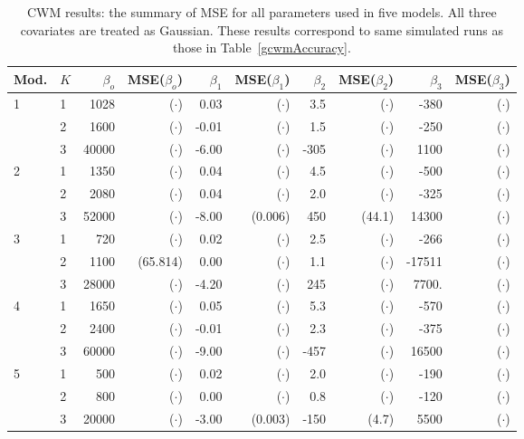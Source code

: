 \documentclass[12pt,letterpaper]{article}
\numberwithin{equation}{section}
\numberwithin{equation}{section}
\numberwithin{equation}{section}
\begin{document}
\begin{table}[!htb]
\centering
\caption{CWM results: the summary of MSE for all parameters used in five models. All three covariates are treated as Gaussian. These results correspond to same simulated runs as those in Table~\ref{gcwmAccuracy}.}
\label{my-label}
\begin{tabular}{ll|rrrrrrrr}
\hline
Mod. & $K$ & $\beta_o$ &  MSE($\beta_o$)   &  $\beta_1$ & MSE($\beta_1$)& $\beta_2$ &MSE($\beta_2$)   & $\beta_3$ &  MSE($\beta_3$)  \\
\hline
1     & 1         & 1028& ($\cdot$)   & 0.03&  ($\cdot$)   & 3.5&  ($\cdot$)    & -380&  ($\cdot$)    \\
      & 2         & 1600&  ($\cdot$)      & -0.01& ($\cdot$)  & 1.5& ($\cdot$)     & -250& ($\cdot$)  \\
      & 3         & 40000& ($\cdot$)     & -6.00& ($\cdot$)  & -305& ($\cdot$)  & 1100& ($\cdot$)    \\
\hline
2     & 1         & 1350& ($\cdot$)     & 0.04& ($\cdot$) & 4.5& ($\cdot$)    & -500& ($\cdot$)  \\
      & 2         & 2080&  ($\cdot$)    & 0.04& ($\cdot$)   & 2.0& ($\cdot$)     & -325& ($\cdot$)   \\
      & 3         & 52000&  ($\cdot$)     & -8.00& (0.006)  & 450& (44.1)   & 14300& ($\cdot$)  \\
\hline
3     & 1         & 720&  ($\cdot$)     & 0.02& ($\cdot$)   & 2.5& ($\cdot$)    & -266& ($\cdot$)    \\
      & 2         & 1100&  (65.814)     & 0.00& ($\cdot$)   & 1.1& ($\cdot$)     & -17511& ($\cdot$)  \\
      & 3         & 28000& ($\cdot$)   & -4.20& ($\cdot$)  & 245& ($\cdot$)   & 7700.& ($\cdot$)  \\
\hline
4     & 1         & 1650& ($\cdot$)    & 0.05& ($\cdot$)  & 5.3& ($\cdot$)    & -570& ($\cdot$)  \\
      & 2         & 2400&  ($\cdot$)     & -0.01& ($\cdot$)  & 2.3& ($\cdot$)    & -375& ($\cdot$)    \\
      & 3         & 60000&  ($\cdot$)     & -9.00& ($\cdot$)  & -457& ($\cdot$)  & 16500& ($\cdot$)   \\
\hline
5     & 1         & 500&  ($\cdot$)     & 0.02& ($\cdot$)   & 2.0& ($\cdot$)   & -190& ($\cdot$)  \\
      & 2         & 800&  ($\cdot$)      & 0.00& ($\cdot$)   & 0.8& ($\cdot$)    & -120& ($\cdot$)  \\
      & 3         & 20000&  ($\cdot$)     & -3.00& (0.003)  & -150& (4.7) & 5500& ($\cdot$) \\
\hline
\end{tabular}
\end{table}
\end{document}
